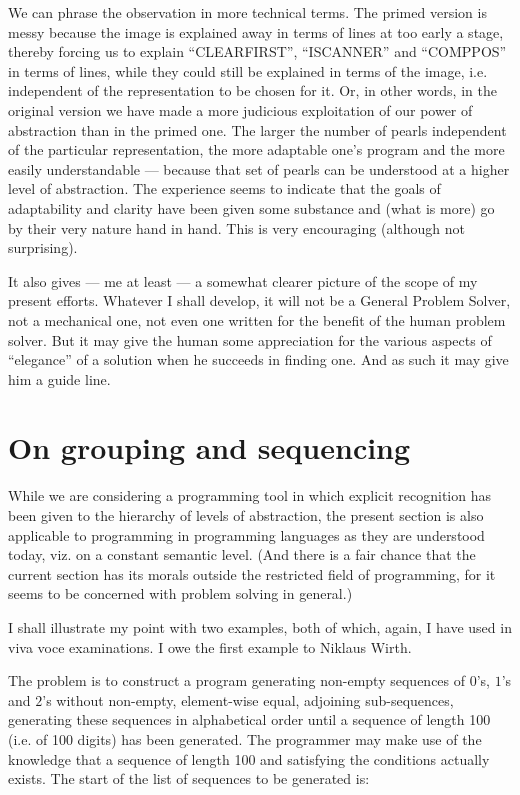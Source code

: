 We can phrase the observation in more technical terms. The primed version is messy because the image is explained away in terms of lines at too early a stage, thereby forcing us to explain ``CLEARFIRST'', ``ISCANNER'' and ``COMPPOS'' in terms of lines, while they could still be explained in terms of the image, i.e. independent of the representation to be chosen for it. Or, in other words, in the original version we have made a more judicious exploitation of our power of abstraction than in the primed one. The larger the number of pearls independent of the particular representation, the more adaptable one's program and the more easily understandable --- because that set of pearls can be understood at a higher level of abstraction. The experience seems to indicate that the goals of adaptability and clarity have been given some substance and (what is more) go by their very nature hand in hand. This is very encouraging (although not surprising).

It also gives --- me at least --- a somewhat clearer picture of the scope of my present efforts. Whatever I shall develop, it will not be a General Problem Solver, not a mechanical one, not even one written for the benefit of the human problem solver. But it may give the human some appreciation for the various aspects of ``elegance'' of a solution when he succeeds in finding one. And as such it may give him a guide line.

\section{On grouping and sequencing}
\label{sec:grouping-and-sequencing}

While we are considering a programming tool in which explicit recognition has been given to the hierarchy of levels of abstraction, the present section is also applicable to programming in programming languages as they are understood today, viz. on a constant semantic level. (And there is a fair chance that the current section has its morals outside the restricted field of programming, for it seems to be concerned with problem solving in general.)

I shall illustrate my point with two examples, both of which, again, I have used in viva voce examinations. I owe the first example to Niklaus Wirth.

The problem is to construct a program generating non-empty sequences of $0$'s, $1$'s and $2$'s without non-empty, element-wise equal, adjoining sub-sequences, generating these sequences in alphabetical order until a sequence of length 100 (i.e. of 100 digits) has been generated. The programmer may make use of the knowledge that a sequence of length 100 and satisfying the conditions actually exists. The start of the list of sequences to be generated is:

